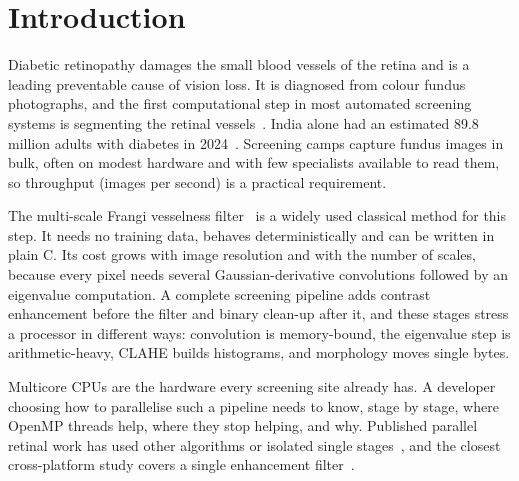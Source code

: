 \section{Introduction}\label{sec:intro}

Diabetic retinopathy damages the small blood vessels of the retina and is a leading preventable cause of
vision loss. It is diagnosed from colour fundus photographs, and the first computational step in most automated
screening systems is segmenting the retinal vessels~\cite{fraz2012}. India alone had an estimated 89.8 million
adults with diabetes in 2024~\cite{idf2025}. Screening camps capture fundus images in bulk, often on modest
hardware and with few specialists available to read them, so throughput (images per second) is a practical
requirement.

The multi-scale Frangi vesselness filter~\cite{frangi1998} is a widely used classical method for this step. It
needs no training data, behaves deterministically and can be written in plain C. Its cost grows with image
resolution and with the number of scales, because every pixel needs several Gaussian-derivative convolutions
followed by an eigenvalue computation. A complete screening pipeline adds contrast enhancement before the filter
and binary clean-up after it, and these stages stress a processor in different ways: convolution is
memory-bound, the eigenvalue step is arithmetic-heavy, CLAHE builds histograms, and morphology moves single
bytes.

Multicore CPUs are the hardware every screening site already has. A developer choosing how to parallelise such
a pipeline needs to know, stage by stage, where OpenMP threads help, where they stop helping, and why.
Published parallel retinal work has used other algorithms or isolated single stages~\cite{arguello2018,bensayadia2020}, and the closest cross-platform study covers a single enhancement filter~\cite{song2022}.

